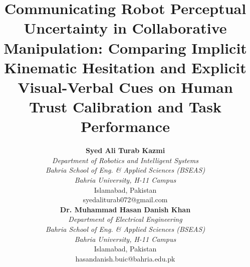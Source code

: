 \documentclass[conference]{IEEEtran}
\DeclareRobustCommand{\IEEEauthorblockN}[1]{{\normalsize\bfseries #1}\par\vskip 2pt}
\DeclareRobustCommand{\IEEEauthorblockA}[1]{{\small #1}\par}
\begin{document}
\title{Communicating Robot Perceptual Uncertainty in Collaborative Manipulation: Comparing Implicit Kinematic Hesitation and Explicit Visual-Verbal Cues on Human Trust Calibration and Task Performance}

\author{
\parbox{0.46\textwidth}{\centering
    \IEEEauthorblockN{Syed Ali Turab Kazmi}
    \IEEEauthorblockA{\textit{Department of Robotics and Intelligent Systems} \\
    \textit{Bahria School of Eng. \& Applied Sciences (BSEAS)} \\
    \textit{Bahria University, H-11 Campus} \\
    Islamabad, Pakistan \\
    syedaliturab072@gmail.com}
}
\hfill
\parbox{0.46\textwidth}{\centering
    \IEEEauthorblockN{Dr. Muhammad Hasan Danish Khan}
    \IEEEauthorblockA{\textit{Department of Electrical Engineering} \\
    \textit{Bahria School of Eng. \& Applied Sciences (BSEAS)} \\
    \textit{Bahria University, H-11 Campus} \\
    Islamabad, Pakistan \\
    hasandanish.buic@bahria.edu.pk}
}
}

\maketitle
\thispagestyle{empty}
\end{document}
